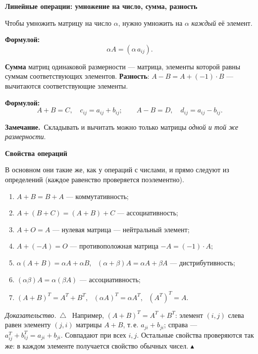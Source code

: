 \documentclass[a4paper,11pt]{article}
\newcommand{\fm}{\par\noindent\textbf{\textcolor{oprc!85!black}{Формулой:}}}
\newcommand{\zam}{\par\smallskip\noindent\textbf{\textcolor{zamc}{Замечание.}}\ }
\newenvironment{dok}
  {\par\smallskip\noindent\textit{Доказательство.}\ $\triangle$\ \ignorespaces}
  {\unskip\nobreak\hfill$\blacktriangle$\par\smallskip}
\newcommand{\podr}[1]{\par\needspace{8\baselineskip}\medskip
  {\large\bfseries\textcolor{oprc!80!black}{#1}}\par\nopagebreak\smallskip}
\begin{document}
\podr{Линейные операции: умножение на число, сумма, разность}

\begin{opr}
Чтобы умножить матрицу на число $\alpha$, нужно умножить на $\alpha$ \emph{каждый} её элемент.
\fm
\[
  \alpha A = (\alpha\, a_{ij}).
\]
\end{opr}

\begin{opr}
\textbf{Сумма} матриц одинаковой размерности --- матрица, элементы которой равны суммам соответствующих элементов.
\textbf{Разность}: $A - B = A + (-1)\cdot B$ --- вычитаются соответствующие элементы.
\fm
\[
  A + B = C, \quad c_{ij} = a_{ij} + b_{ij}; \qquad A - B = D, \quad d_{ij} = a_{ij} - b_{ij}.
\]
\end{opr}

\zam Складывать и вычитать можно только матрицы \emph{одной и той же размерности}.

\podr{Свойства операций}

В основном они такие же, как у операций с числами, и прямо следуют из определений
(каждое равенство проверяется поэлементно).

\begin{teo}
\begin{enumerate}[leftmargin=*]
  \item $A + B = B + A$ --- коммутативность;
  \item $A + (B + C) = (A + B) + C$ --- ассоциативность;
  \item $A + O = A$ --- нулевая матрица --- нейтральный элемент;
  \item $A + (-A) = O$ --- противоположная матрица $-A = (-1)\cdot A$;
  \item $\alpha(A + B) = \alpha A + \alpha B$, \ $(\alpha + \beta)A = \alpha A + \beta A$ --- дистрибутивность;
  \item $(\alpha\beta)A = \alpha(\beta A)$ --- ассоциативность;
  \item $(A + B)^T = A^T + B^T$, \ $(\alpha A)^T = \alpha A^T$, \ $(A^T)^T = A$.
\end{enumerate}
\end{teo}

\begin{dok}
Например, $(A + B)^T = A^T + B^T$: элемент $(i, j)$ слева равен элементу $(j, i)$ матрицы $A + B$, т.\,е. $a_{ji} + b_{ji}$;
справа --- $a^T_{ij} + b^T_{ij} = a_{ji} + b_{ji}$. Совпадают при всех $i, j$. Остальные свойства проверяются так же:
в каждом элементе получается свойство обычных чисел.
\end{dok}
\end{document}
